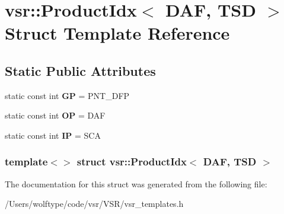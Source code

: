 \hypertarget{structvsr_1_1_product_idx_3_01_d_a_f_00_01_t_s_d_01_4}{\section{vsr\-:\-:Product\-Idx$<$ D\-A\-F, T\-S\-D $>$ Struct Template Reference}
\label{structvsr_1_1_product_idx_3_01_d_a_f_00_01_t_s_d_01_4}
}
\subsection*{Static Public Attributes}
\begin{DoxyCompactItemize}
\item 
\hypertarget{structvsr_1_1_product_idx_3_01_d_a_f_00_01_t_s_d_01_4_a34e8d0b1cf59256c01b353005f669a69}{static const int {\bfseries G\-P} = P\-N\-T\-\_\-\-D\-F\-P}\label{structvsr_1_1_product_idx_3_01_d_a_f_00_01_t_s_d_01_4_a34e8d0b1cf59256c01b353005f669a69}

\item 
\hypertarget{structvsr_1_1_product_idx_3_01_d_a_f_00_01_t_s_d_01_4_aac04ea4a60297f05715c1ff2bbe20082}{static const int {\bfseries O\-P} = D\-A\-F}\label{structvsr_1_1_product_idx_3_01_d_a_f_00_01_t_s_d_01_4_aac04ea4a60297f05715c1ff2bbe20082}

\item 
\hypertarget{structvsr_1_1_product_idx_3_01_d_a_f_00_01_t_s_d_01_4_a447c6f317dc2b18c6bfe862921b44a85}{static const int {\bfseries I\-P} = S\-C\-A}\label{structvsr_1_1_product_idx_3_01_d_a_f_00_01_t_s_d_01_4_a447c6f317dc2b18c6bfe862921b44a85}

\end{DoxyCompactItemize}
\subsubsection*{template$<$$>$ struct vsr\-::\-Product\-Idx$<$ D\-A\-F, T\-S\-D $>$}



The documentation for this struct was generated from the following file\-:\begin{DoxyCompactItemize}
\item 
/\-Users/wolftype/code/vsr/\-V\-S\-R/vsr\-\_\-templates.\-h\end{DoxyCompactItemize}

